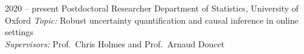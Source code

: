 \documentclass[9pt]{developercv} %
\begin{document}
\begin{minipage}[t]{\textwidth}

\end{minipage}

\vspace{.5cm}




\begin{entrylist}
    \entry
    {2020 -- present}
    {Postdoctoral Researcher}
    {Department of Statistics, University of Oxford}
    {\textit{Topic:} Robust uncertainty quantification and causal inference in online settings \\
    \textit{Supervisors:} Prof.\ Chris Holmes and Prof.\ Arnaud Doucet}
\end{entrylist}
\end{document}
